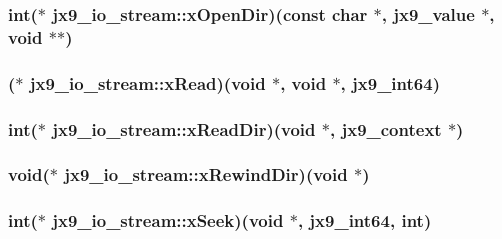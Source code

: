 \hypertarget{structjx9__io__stream_a205f713f920e2b646061c55de3d82157}{
\subsubsection[{x\-Open\-Dir}]{\setlength{\rightskip}{0pt plus 5cm}int($\ast$ jx9\-\_\-io\-\_\-stream\-::x\-Open\-Dir)(const char $\ast$, {\bf jx9\-\_\-value} $\ast$, void $\ast$$\ast$)}}\label{d0/d90/structjx9__io__stream_a205f713f920e2b646061c55de3d82157}
\hypertarget{structjx9__io__stream_aa463a8e1c68bf9a5e2b58d0ad6b40ad9}{
\subsubsection[{x\-Read}]{($\ast$ jx9\-\_\-io\-\_\-stream\-::x\-Read)(void $\ast$, void $\ast$, {\bf jx9\-\_\-int64})}}\label{d0/d90/structjx9__io__stream_aa463a8e1c68bf9a5e2b58d0ad6b40ad9}
\hypertarget{structjx9__io__stream_a86708982144de161440bc422a3d477ef}{
\subsubsection[{x\-Read\-Dir}]{\setlength{\rightskip}{0pt plus 5cm}int($\ast$ jx9\-\_\-io\-\_\-stream\-::x\-Read\-Dir)(void $\ast$, {\bf jx9\-\_\-context} $\ast$)}}\label{d0/d90/structjx9__io__stream_a86708982144de161440bc422a3d477ef}
\hypertarget{structjx9__io__stream_acc37504a38ef9aa76c8cbcdc467c94f9}{
\subsubsection[{x\-Rewind\-Dir}]{\setlength{\rightskip}{0pt plus 5cm}void($\ast$ jx9\-\_\-io\-\_\-stream\-::x\-Rewind\-Dir)(void $\ast$)}}\label{d0/d90/structjx9__io__stream_acc37504a38ef9aa76c8cbcdc467c94f9}
\hypertarget{structjx9__io__stream_a1465a4adf477d491ebcb8d37d370a4ec}{
\subsubsection[{x\-Seek}]{\setlength{\rightskip}{0pt plus 5cm}int($\ast$ jx9\-\_\-io\-\_\-stream\-::x\-Seek)(void $\ast$, {\bf jx9\-\_\-int64}, int)}}\label{d0/d90/structjx9__io__stream_a1465a4adf477d491ebcb8d37d370a4ec}
